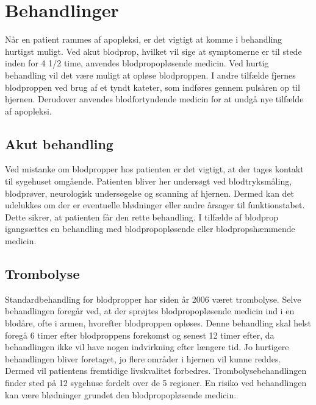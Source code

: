 \section{Behandlinger}
Når en patient rammes af apopleksi, er det vigtigt at komme i behandling hurtigst muligt. Ved akut blodprop, hvilket vil sige at symptomerne er til stede inden for 4 1/2 time, anvendes blodpropopløsende medicin. Ved hurtig behandling vil det være muligt at opløse blodproppen. I andre tilfælde fjernes blodproppen ved brug af et tyndt kateter, som indføres gennem pulsåren op til hjernen. Derudover anvendes blodfortyndende medicin for at undgå nye tilfælde af apopleksi. \cite{Hjerteforeningen2014} \cite{Kruuse2014a}

\subsection{Akut behandling}
Ved mistanke om blodpropper hos patienten er det vigtigt, at der tages kontakt til sygehuset omgående. Patienten bliver her undersøgt ved blodtryksmåling, blodprøver, neurologisk undersøgelse og scanning af hjernen. Dermed kan det udelukkes om der er eventuelle blødninger eller andre årsager til funktionstabet. Dette  sikrer, at patienten får den rette behandling. I tilfælde af blodprop igangsættes en behandling med blodpropopløsende eller blodpropshæmmende medicin. \cite{Hjerteforeningen2014} \cite{Kruuse2014a} 

\subsection{Trombolyse}
Standardbehandling for blodpropper har siden år 2006 været trombolyse. Selve behandlingen foregår ved, at der sprøjtes blodpropopløsende medicin ind i en blodåre, ofte i armen, hvorefter blodproppen opløses. Denne behandling skal helst foregå 6 timer efter blodproppens forekomst og senest 12 timer efter, da behandlingen ikke vil have nogen indvirkning efter længere tid. Jo hurtigere behandlingen bliver foretaget, jo flere områder i hjernen vil kunne reddes. Dermed vil patientens fremtidige livskvalitet forbedres. Trombolysebehandlingen finder sted på 12 sygehuse fordelt over de 5 regioner. En risiko ved behandlingen kan være blødninger grundet den blodpropopløsende medicin.\cite{Hjernesagen2015b} 

